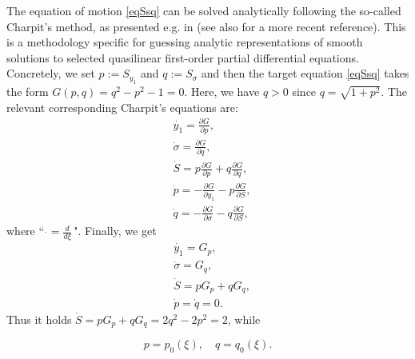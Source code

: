 \documentclass[reqno, 11pt]{amsart}
\numberwithin{equation}{section}
\begin{document}
The equation of motion \eqref{eqSsq} can be solved analytically following  the so-called Charpit's method,  as presented e.g. in \cite{HLMO} (see also \cite{Charpit} for a more recent reference). This is a methodology specific for guessing analytic representations of smooth solutions  to selected quasilinear first-order
partial differential equations. Concretely, we set $p:=S_{y_1}$ and $q:=S_{\sigma}$ and then the target equation \eqref{eqSsq}  takes the form $G(p,q)=q^2-p^2-1=0$. Here, we have $q>0$ since $q=\sqrt{1+p^2}$. The relevant corresponding  Charpit's equations are:
 \begin{eqnarray*}\label{eqCe}
& \dot{{y_1}}=\frac{\partial G}{\partial p},\\
& \dot{\sigma}=\frac{\partial G}{\partial q},\\
& \dot S =p\frac{\partial G}{\partial p}+q\frac{\partial G}{\partial q},\\
 & \dot p=- \frac{\partial G}{\partial y_1}-p \frac{\partial G}{\partial S}, \\
& \dot q=- \frac{\partial G}{\partial \sigma}-q \frac{\partial G}{\partial S},
\end{eqnarray*}
 where ``\,\,$\dot{}=\frac{d}{d \xi}$\,". 
 Finally, we get 
 \begin{eqnarray*}
 & \dot {y_1}=G_p,\\
 & \dot \sigma=G_q,\\
& \dot S=pG_p+qG_q,\\
 & \dot p=\dot q=0.
 \end{eqnarray*}
Thus it holds $\dot S=pG_p+qG_q=2q^2-2p^2=2$, while

  \[  p=p_0(\xi) ,\quad q=q_0(\xi).\]
 
\end{document}
